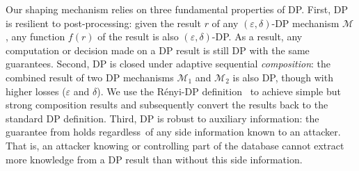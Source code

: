 Our shaping mechanism relies on three fundamental properties of DP.
First, DP is resilient to post-processing: given the result $r$ of any
$(\varepsilon, \delta)$-DP mechanism $\mathcal{M}$, any function $f(r)$
of the result is also $(\varepsilon, \delta)$-DP.
As a result, any computation or decision made on a DP result is still DP with
the same guarantees.
Second, DP is closed under adaptive sequential {\em composition}: the combined
result of two DP mechanisms $\mathcal{M}_1$ and $\mathcal{M}_2$ is also DP,
though with higher losses ($\varepsilon$ and $\delta$).
We use the R\'enyi-DP definition~\cite{mironov2017renyi} to achieve simple but
strong composition results and subsequently convert the results
back to the standard DP definition.
%
Third, DP is robust to auxiliary information: the guarantee from 
holds regardless~of any side information known to an attacker.
That is, an attacker knowing or controlling part of the database cannot extract
more knowledge from a DP result than without this side information.


